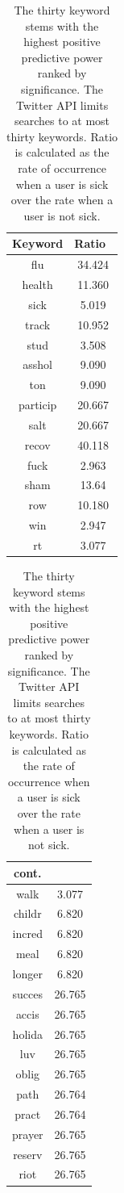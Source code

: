 \documentclass{acm_proc_article-sp}
\begin{document}
\begin{table}[!ht]
\centering
\begin{tabular}{|c|c|}\hline
Keyword&Ratio\ \\ \hline
flu &  34.424\\ \hline
health &  11.360\\ \hline
sick &  5.019\\ \hline
track & 10.952 \\ \hline
stud & 3.508 \\ \hline
asshol & 9.090 \\ \hline
ton & 9.090 \\ \hline
particip & 20.667 \\ \hline
salt & 20.667 \\ \hline
recov & 40.118 \\ \hline
fuck & 2.963 \\ \hline
sham & 13.64 \\ \hline
row & 10.180 \\ \hline
win & 2.947 \\ \hline
rt & 3.077 \\ \hline
  \end{tabular}
  \hspace{1em}
\begin{tabular}{|c|c|}\hline
cont. & \\ \hline
walk & 3.077 \\ \hline
childr & 6.820 \\ \hline
incred & 6.820 \\ \hline
meal & 6.820 \\ \hline
longer &  6.820 \\ \hline
succes &  26.765 \\ \hline
accis & 26.765 \\ \hline
holida & 26.765 \\ \hline
luv & 26.765 \\ \hline
oblig & 26.765 \\ \hline
path & 26.764 \\ \hline
pract & 26.764 \\ \hline
prayer & 26.765 \\ \hline
reserv & 26.765 \\ \hline
riot & 26.765 \\ 
\hline\end{tabular}
\caption{The thirty keyword stems with the highest positive predictive power ranked by significance. The Twitter API limits searches to at most thirty keywords. Ratio is calculated as the rate of occurrence when a user is sick over the rate when a user is not sick.}
\label{tab:thirty_best}
\end{table}


\balancecolumns

\end{document}
